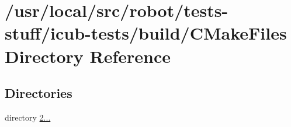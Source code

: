 \section{/usr/local/src/robot/tests-\/stuff/icub-\/tests/build/\-C\-Make\-Files Directory Reference}
\label{dir_b673233928467334ffecfef07ea67227}
\subsection*{Directories}
\begin{DoxyCompactItemize}
\item 
directory \hyperlink{dir_97123f7bbb049a6c037d164abeb401cf}{2...}
\end{DoxyCompactItemize}
